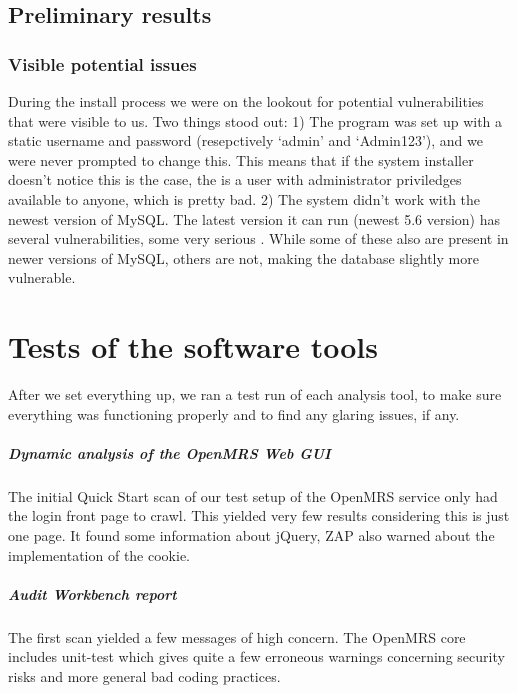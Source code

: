 \documentclass{report} %
\begin{document}
\section{Preliminary results}

\subsection{Visible potential issues}
  During the install process we were on the lookout for potential vulnerabilities that
  were visible to us. Two things stood out:
  1) The program was set up with a static username and password (resepctively `admin'
  and `Admin123'), and we were never prompted to change this. This means that if the system
  installer doesn't notice this is the case, the is a user with administrator priviledges
  available to anyone, which is pretty bad.
  2) The system didn't work with the newest version of MySQL. The latest version it can run (newest 5.6 version)
  has several vulnerabilities, some very serious \autocite[]{CVEDetails}. While some of these
  also are present in newer versions of MySQL, others are not, making the database slightly more vulnerable.

\chapter{Tests of the software tools}

  After we set everything up, we ran a test run of each analysis tool, to make sure
  everything was functioning properly and to find any glaring issues, if any.

\paragraph{Dynamic analysis of the OpenMRS Web GUI}
  
  The initial Quick Start scan of our test setup of the OpenMRS service only had
  the login front page to crawl. This yielded very few results considering this
  is just one page. It found some information about jQuery, ZAP also warned
  about the implementation of the cookie.
  
\paragraph{Audit Workbench report}  

  The first scan yielded a few messages of high concern. The OpenMRS core
  includes unit-test which gives quite a few erroneous warnings concerning
  security risks and more general bad coding practices. 
\end{document}
